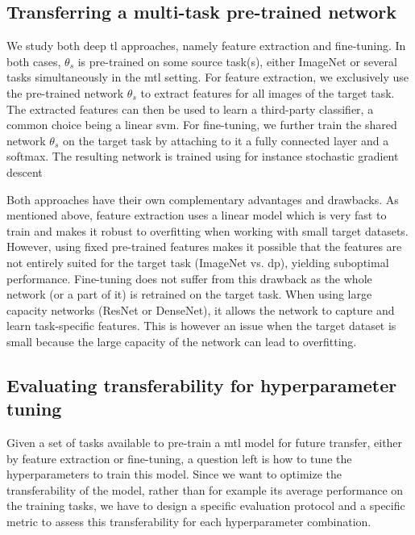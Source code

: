 
\subsection{Transferring a multi-task pre-trained network}
\label{ssec:mtask:transfer_techniques}

We study both deep \acrlong{tl} approaches, namely feature extraction and fine-tuning. In both cases, $\theta_s$ is pre-trained on some source task(s), either ImageNet or several tasks simultaneously in the \acrshort{mtl} setting. For feature extraction, we exclusively use the pre-trained network $\theta_s$ to extract features for all images of the target task. The extracted features can then be used to learn a third-party classifier, a common choice being a linear \acrshort{svm}. For fine-tuning, we further train the shared network $\theta_s$ on the target task by attaching to it a fully connected layer and a softmax. The resulting network is trained using for instance stochastic gradient descent

Both approaches have their own complementary advantages and drawbacks. As mentioned above, feature extraction uses a linear model which is very fast to train and makes it robust to overfitting when working with small target datasets. However, using fixed pre-trained features makes it possible that the features are not entirely suited for the target task (\eg ImageNet vs. \acrlong{dp}), yielding suboptimal performance. Fine-tuning does not suffer from this drawback as the whole network (or a part of it) is retrained on the target task. When using large capacity networks (\eg ResNet or DenseNet), it allows the network to capture and learn task-specific features. This is however an issue when the target dataset is small because the large capacity of the network can lead to overfitting.

\subsection{Evaluating transferability for hyperparameter tuning}
\label{ssec:mtask:exp:transfer_eval}\label{ssec:mtask:exp:model_selection}

Given a set of tasks available to pre-train a \acrshort{mtl} model for future transfer, either by feature extraction or fine-tuning, a question left is how to tune the hyperparameters to train this model. Since we want to optimize the transferability of the model, rather than for example its average performance on the training tasks, we have to design a specific evaluation protocol and a specific metric to assess this transferability for each hyperparameter combination.

